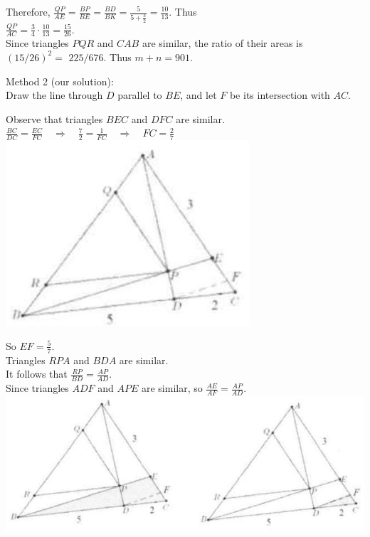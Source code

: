 \documentclass[10pt]{article}
\begin{document}
Therefore, \(\frac{Q P}{A E}=\frac{B P}{B E}=\frac{B D}{B K}=\frac{5}{5+\frac{3}{2}}=\frac{10}{13}\). Thus\\
\(\frac{Q P}{A C}=\frac{3}{4} \cdot \frac{10}{13}=\frac{15}{26}\).\\
Since triangles \(P Q R\) and \(C A B\) are similar, the ratio of their areas is \((15 / 26)^{2}=\) \(225 / 676\). Thus \(m+n=901\).

Method 2 (our solution):\\
Draw the line through \(D\) parallel to \(B E\), and let \(F\) be its intersection with \(A C\).

Observe that triangles \(B E C\) and \(D F C\) are similar.\\
\(\frac{B C}{D C}=\frac{E C}{F C} \quad \Rightarrow \quad \frac{7}{2}=\frac{1}{F C} \quad \Rightarrow \quad F C=\frac{2}{7}\)\\
\includegraphics[max width=\textwidth, center]{2025_04_17_97bc1f7e44d93c271a88g-122(1)}

So \(E F=\frac{5}{7}\).\\
Triangles \(R P A\) and \(B D A\) are similar.\\
It follows that \(\frac{R P}{B D}=\frac{A P}{A D}\).\\
Since triangles \(A D F\) and \(A P E\) are similar, so \(\frac{A E}{A F}=\frac{A P}{A D}\).\\
\includegraphics[max width=\textwidth, center]{2025_04_17_97bc1f7e44d93c271a88g-122(2)}
\end{document}
